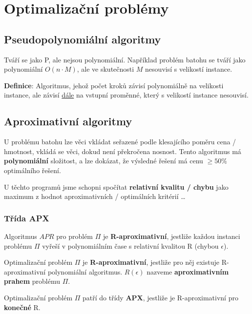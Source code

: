 \section{Optimalizační problémy}

\subsection{Pseudopolynomiální algoritmy}

Tváří se jako P, ale nejsou polynomiální. Například problém batohu se tváří jako polynomiální $O(n\cdot{}M)$, ale ve skutečnosti $M$ nesouvisí s velikostí instance.

\vspace{4pt}
\noindent \textbf{Definice}: Algoritmus, jehož počet kroků závisí polynomiálně na velikosti instance, ale závisí \underline{dále} na vstupní proměnné, který s velikostí instance nesouvisí.

\subsection{Aproximativní algoritmy}

U problému batohu lze věci vkládat seřazené podle klesajícího poměru cena / hmotnost, vkládá se věci, dokud není překročena nosnost. Tento algoritmus má \textbf{polynomiální} složitost, a lze dokázat, že výsledné řešení má cenu $\geq 50\%$ optimálního řešení.

\vspace{4pt}
\noindent U těchto programů jsme schopni spočítat \textbf{relativní kvalitu / chybu} jako maximum z hodnot aproximativních / optimálních kritérií \ldots

\subsubsection{Třída APX}

Algoritmus $APR$ pro problém $\Pi$ je \textbf{R-aproximativní}, jestliže každou instanci problému $\Pi$ vyřeší v polynomiálním čase s relativní kvalitou R (chybou $\epsilon$).

\vspace{4pt}
\noindent Optimalizační problém $\Pi$ je \textbf{R-aproximativní}, jestliže pro něj existuje R-aproximativní polynomiální algoritmus. $R(\epsilon)$ nazveme \textbf{aproximativním prahem} problému $\Pi$.

\vspace{4pt}
\noindent Optimalizační problém $\Pi$ patří do třídy \textbf{APX}, jestliže je R-aproximativní pro \textbf{konečné} R.

